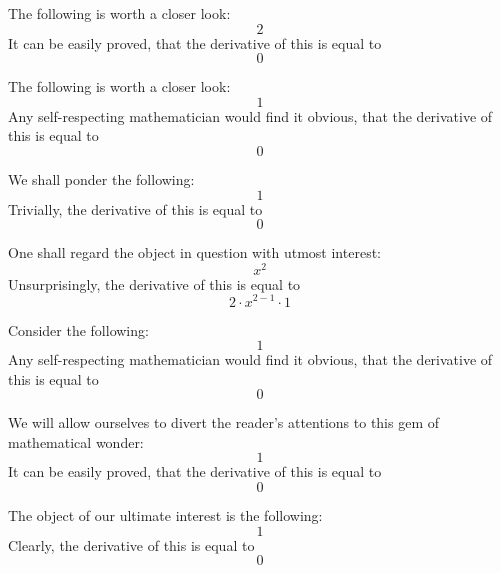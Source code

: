 \documentclass{article}
\begin{document}
The following is worth a closer look:
\begin{equation}
2 
\end{equation}
It can be easily proved, that the derivative of this is equal to
\begin{equation}
0 
\end{equation}

The following is worth a closer look:
\begin{equation}
1 
\end{equation}
Any self-respecting mathematician would find it obvious, that the derivative of this is equal to
\begin{equation}
0 
\end{equation}

We shall ponder the following:
\begin{equation}
1 
\end{equation}
Trivially, the derivative of this is equal to
\begin{equation}
0 
\end{equation}

One shall regard the object in question with utmost interest:
\begin{equation}
x ^{2 } 
\end{equation}
Unsurprisingly, the derivative of this is equal to
\begin{equation}
2 \cdot x ^{2 - 1 } \cdot 1 
\end{equation}

Consider the following:
\begin{equation}
1 
\end{equation}
Any self-respecting mathematician would find it obvious, that the derivative of this is equal to
\begin{equation}
0 
\end{equation}

We will allow ourselves to divert the reader's attentions to this gem of mathematical wonder:
\begin{equation}
1 
\end{equation}
It can be easily proved, that the derivative of this is equal to
\begin{equation}
0 
\end{equation}

The object of our ultimate interest is the following:
\begin{equation}
1 
\end{equation}
Clearly, the derivative of this is equal to
\begin{equation}
0 
\end{equation}
\end{document}
